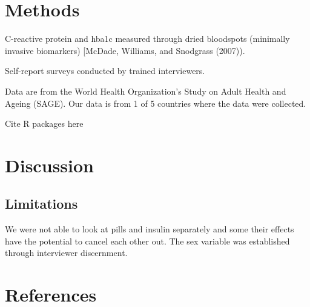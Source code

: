 \documentclass[
  man,floatsintext]{apa6}
\begin{document}
\hypertarget{methods}{%
\section{Methods}\label{methods}}

C-reactive protein and hba1c measured through dried bloodspots (minimally invasive biomarkers) {[}McDade, Williams, and Snodgrass (2007)).

Self-report surveys conducted by trained interviewers.

Data are from the World Health Organization's Study on Adult Health and Ageing (SAGE). Our data is from 1 of 5 countries where the data were collected.

Cite R packages here

\hypertarget{discussion}{%
\section{Discussion}\label{discussion}}

\hypertarget{limitations}{%
\subsection{Limitations}\label{limitations}}

We were not able to look at pills and insulin separately and some their effects have the potential to cancel each other out. The sex variable was established through interviewer discernment.

\hypertarget{references}{%
\section*{References}\label{references}}
\end{document}
